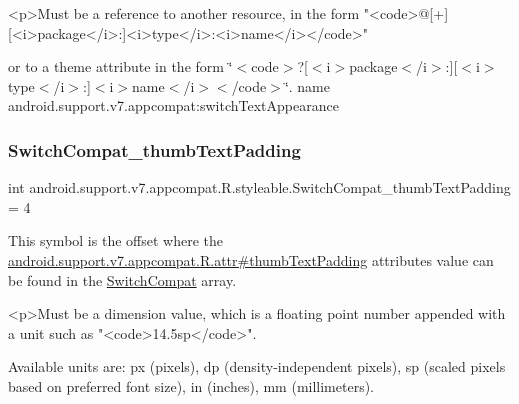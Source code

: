 \begin{DoxyVerb}      <p>Must be a reference to another resource, in the form "<code>@[+][<i>package</i>:]<i>type</i>:<i>name</i></code>"
\end{DoxyVerb}
 or to a theme attribute in the form \char`\"{}$<$code$>$?\mbox{[}$<$i$>$package$<$/i$>$\+:\mbox{]}\mbox{[}$<$i$>$type$<$/i$>$\+:\mbox{]}$<$i$>$name$<$/i$>$$<$/code$>$\char`\"{}.  name android.\+support.\+v7.\+appcompat\+:switch\+Text\+Appearance \mbox{\label{classandroid_1_1support_1_1v7_1_1appcompat_1_1R_1_1styleable_a3401586689d04cc21ba913560a965943}} 
\subsubsection{\texorpdfstring{Switch\+Compat\+\_\+thumb\+Text\+Padding}{SwitchCompat\_thumbTextPadding}}
{\footnotesize\ttfamily int android.\+support.\+v7.\+appcompat.\+R.\+styleable.\+Switch\+Compat\+\_\+thumb\+Text\+Padding = 4\hspace{0.3cm}{\ttfamily [static]}}

This symbol is the offset where the \hyperlink{classandroid_1_1support_1_1v7_1_1appcompat_1_1R_1_1attr_a9e2343866e46c4e63f8d38f7f54cfbf5}{android.\+support.\+v7.\+appcompat.\+R.\+attr\#thumb\+Text\+Padding} attribute\textquotesingle{}s value can be found in the \hyperlink{classandroid_1_1support_1_1v7_1_1appcompat_1_1R_1_1styleable_aabe688560752254f2288f3eaf9439737}{Switch\+Compat} array.

\begin{DoxyVerb}      <p>Must be a dimension value, which is a floating point number appended with a unit such as "<code>14.5sp</code>".
\end{DoxyVerb}
 Available units are\+: px (pixels), dp (density-\/independent pixels), sp (scaled pixels based on preferred font size), in (inches), mm (millimeters). 

